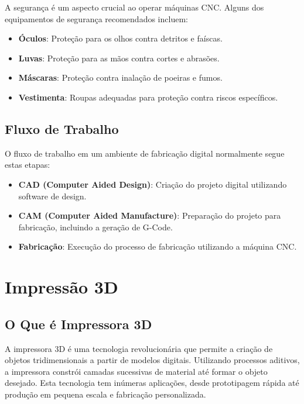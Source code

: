 \documentclass[
]{book}
\providecommand{\tightlist}{%
  \setlength{\itemsep}{0pt}\setlength{\parskip}{0pt}}
\begin{document}
A segurança é um aspecto crucial ao operar máquinas CNC. Alguns dos equipamentos de segurança recomendados incluem:

\begin{itemize}
\tightlist
\item
  \textbf{Óculos}: Proteção para os olhos contra detritos e faíscas.
\item
  \textbf{Luvas}: Proteção para as mãos contra cortes e abrasões.
\item
  \textbf{Máscaras}: Proteção contra inalação de poeiras e fumos.
\item
  \textbf{Vestimenta}: Roupas adequadas para proteção contra riscos específicos.
\end{itemize}

\section{Fluxo de Trabalho}\label{fluxo-de-trabalho}

O fluxo de trabalho em um ambiente de fabricação digital normalmente segue estas etapas:

\begin{itemize}
\tightlist
\item
  \textbf{CAD (Computer Aided Design)}: Criação do projeto digital utilizando software de design.
\item
  \textbf{CAM (Computer Aided Manufacture)}: Preparação do projeto para fabricação, incluindo a geração de G-Code.
\item
  \textbf{Fabricação}: Execução do processo de fabricação utilizando a máquina CNC.
\end{itemize}

\chapter{Impressão 3D}\label{impressuxe3o-3d}

\section{O Que é Impressora 3D}\label{o-que-uxe9-impressora-3d}

A impressora 3D é uma tecnologia revolucionária que permite a criação de objetos tridimensionais a partir de modelos digitais. Utilizando processos aditivos, a impressora constrói camadas sucessivas de material até formar o objeto desejado. Esta tecnologia tem inúmeras aplicações, desde prototipagem rápida até produção em pequena escala e fabricação personalizada.
\end{document}
